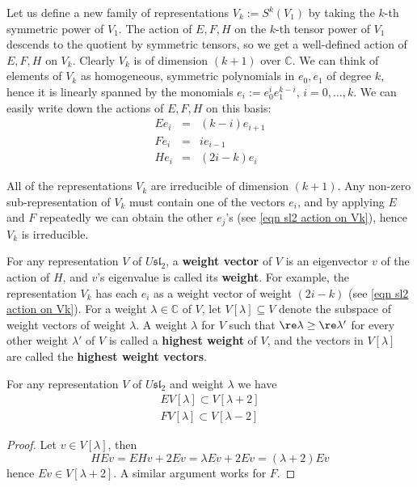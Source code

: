 Let us define a new family of representations $V_k := S^k(V_1)$ by taking the $k$-th symmetric power of $V_1$. The action of $E,F,H$ on the $k$-th tensor power of $V_1$ descends to the quotient by symmetric tensors, so we get a well-defined action of $E,F,H$ on $V_k$. Clearly $V_k$ is of dimension $(k+1)$ over $\mathbb C$. We can think of elements of $V_k$ as homogeneous, symmetric polynomials in $e_0,e_1$ of degree $k$, hence it is linearly spanned by the monomials $e_i := e_0^i e_1^{k-i}$, $i=0,\ldots,k$. We can easily write down the actions of $E,F,H$ on this basis:
\begin{equation}
\label{eqn sl2 action on Vk}
\begin{array}{rclcrcl}
	E e_i &=& (k-i) e_{i+1} \\
	F e_i &=& i e_{i-1} \\
	H e_i &=& (2i - k) e_i 
\end{array}
\end{equation}

All of the representations $V_k$ are irreducible of dimension $(k+1)$. Any non-zero sub-representation of $V_k$ must contain one of the vectors $e_i$, and by applying $E$ and $F$ repeatedly we can obtain the other $e_j$'s (see \cref{eqn sl2 action on Vk}), hence $V_k$ is irreducible. 

For any representation $V$ of $U\mathfrak{sl}_2$, a \textbf{weight vector} of $V$ is an eigenvector $v$ of the action of $H$, and $v$'s eigenvalue is called its \textbf{weight}. For example, the representation $V_k$ has each $e_i$ as a weight vector of weight $(2i-k)$ (see \cref{eqn sl2 action on Vk}). For a weight $\lambda \in \mathbb C$ of $V$, let $V[\lambda] \subseteq V$ denote the subspace of weight vectors of weight $\lambda$. A weight $\lambda$ for $V$ such that $\re \lambda \geq \re \lambda'$ for every other weight $\lambda'$ of $V$ is called a \textbf{highest weight} of $V$, and the vectors in $V[\lambda]$ are called the \textbf{highest weight vectors}.

\begin{lem}
For any representation $V$ of $U\mathfrak{sl}_2$ and weight $\lambda$ we have
\[ \begin{array}{c}
	EV[\lambda] \subset V[\lambda+2] \\
	FV[\lambda] \subset V[\lambda-2] 
\end{array} \]
\end{lem}
\begin{proof}
Let $v \in V[\lambda]$, then
\[ HEv = EHv + 2Ev = \lambda Ev + 2Ev = (\lambda + 2)Ev \]
hence $Ev \in V[\lambda+2]$. A similar argument works for $F$.
\end{proof}


